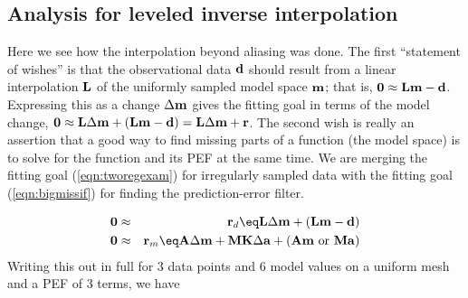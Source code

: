 \subsection{Analysis for leveled inverse interpolation }
Here we see how the interpolation beyond aliasing was done.
The first ``statement of wishes'' is that the observational data $\bold d$
should result from a linear interpolation $\bold L$ of the uniformly sampled
model space $\bold m$; that is,
$ \bold 0 \approx \bold L \bold m - \bold d $.
Expressing this as a change $\Delta \bold m$ gives the fitting goal
in terms of the model change, 
$\bold 0 \approx\bold L \Delta\bold m+(\bold L \bold m-\bold d)=\bold L \Delta\bold m + \bold r $.
The second wish is really an assertion
that a good way to find missing parts of a function
(the model space)
is to solve for the function and its PEF at the same time.
We are merging the fitting goal
(\ref{eqn:tworegexam}) for irregularly sampled data with the fitting goal
(\ref{eqn:bigmissif}) for finding the prediction-error filter.
\par
\begin{eqnarray}
\label{eqn:nirvana1}
\bold 0 &\approx& \bold r_d \eq
\bold L \Delta \bold m + (\bold L \bold m - \bold d) \\
\label{eqn:nirvana2}
\bold 0 &\approx& \bold r_m \eq
\bold A         \Delta \bold m +
\bold M \bold K \Delta \bold a +
(\bold A\bold m \ {\rm or}\
 \bold M\bold a)
\end{eqnarray}
Writing this out in full for 3 data points
and 6 model values on a uniform mesh
and a PEF of 3 terms,
we have
